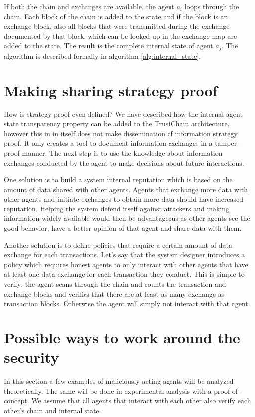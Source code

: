 If both the chain and exchanges are available, the agent $a_i$ loops through the chain. Each block 
of the chain is added to the state and if the block is an exchange block, also all blocks that were
transmitted during the exchange documented by that block, which can be looked up in the exchange map
are added to the state. The result is the complete internal state of agent $a_j$. The algorithm is 
described formally in algorithm \ref{alg:internal_state}.

\section{Making sharing strategy proof}
\label{sec:strategy_proof_sharing}
{\color{red} How is strategy proof even defined?}
We have described how the internal agent state transparency property can be added to the TrustChain 
architecture, however this in in itself does not make dissemination of information strategy proof. 
It only creates a tool to document information exchanges in a tamper-proof manner. The next step is
to use the knowledge about information exchanges conducted by the agent to make decisions about 
future interactions. 

One solution is to build a system internal reputation which is based on the amount of data shared 
with other agents. Agents that exchange more data with other agents and initiate exchanges to obtain
more data should have increased reputation. Helping the system defend itself against attackers and 
making information widely available would then be advantageous as other agents see the good behavior,
have a better opinion of that agent and share data with them. 

Another solution is to define policies that require a certain amount of data exchange for each 
transactions. Let's say that the system designer introduces a policy which requires honest agents to
only interact with other agents that have at least one data exchange for each transaction they conduct.
This is simple to verify: the agent scans through the chain and counts the transaction and exchange
blocks and verifies that there are at least as many exchange as transaction blocks. Otherwise the 
agent will simply not interact with that agent.

\section{Possible ways to work around the security}
In this section a few examples of maliciously acting agents will be analyzed theoretically. The 
same will be done in experimental analysis with a proof-of-concept. We assume that all agents that 
interact with each other also verify each other's chain and internal state.

